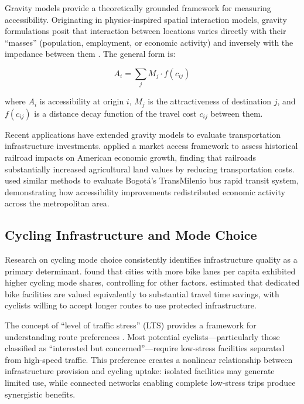 \documentclass[12pt,a4paper]{article}
\begin{document}
Gravity models provide a theoretically grounded framework for measuring accessibility. Originating in physics-inspired spatial interaction models, gravity formulations posit that interaction between locations varies directly with their ``masses'' (population, employment, or economic activity) and inversely with the impedance between them \citep{fotheringham1989spatial}. The general form is:

\begin{equation}
A_i = \sum_j M_j \cdot f(c_{ij})
\label{eq:general_accessibility}
\end{equation}

\noindent where $A_i$ is accessibility at origin $i$, $M_j$ is the attractiveness of destination $j$, and $f(c_{ij})$ is a distance decay function of the travel cost $c_{ij}$ between them.

Recent applications have extended gravity models to evaluate transportation infrastructure investments. \citet{donaldson2016railroads} applied a market access framework to assess historical railroad impacts on American economic growth, finding that railroads substantially increased agricultural land values by reducing transportation costs. \citet{tsivanidis2024evaluating} used similar methods to evaluate Bogot\'{a}'s TransMilenio bus rapid transit system, demonstrating how accessibility improvements redistributed economic activity across the metropolitan area.

\subsection{Cycling Infrastructure and Mode Choice}

Research on cycling mode choice consistently identifies infrastructure quality as a primary determinant. \citet{dill2003bicycle} found that cities with more bike lanes per capita exhibited higher cycling mode shares, controlling for other factors. \citet{hunt2007influences} estimated that dedicated bike facilities are valued equivalently to substantial travel time savings, with cyclists willing to accept longer routes to use protected infrastructure.

The concept of ``level of traffic stress'' (LTS) provides a framework for understanding route preferences \citep{mekuria2012low}. Most potential cyclists---particularly those classified as ``interested but concerned''---require low-stress facilities separated from high-speed traffic. This preference creates a nonlinear relationship between infrastructure provision and cycling uptake: isolated facilities may generate limited use, while connected networks enabling complete low-stress trips produce synergistic benefits.
\end{document}
